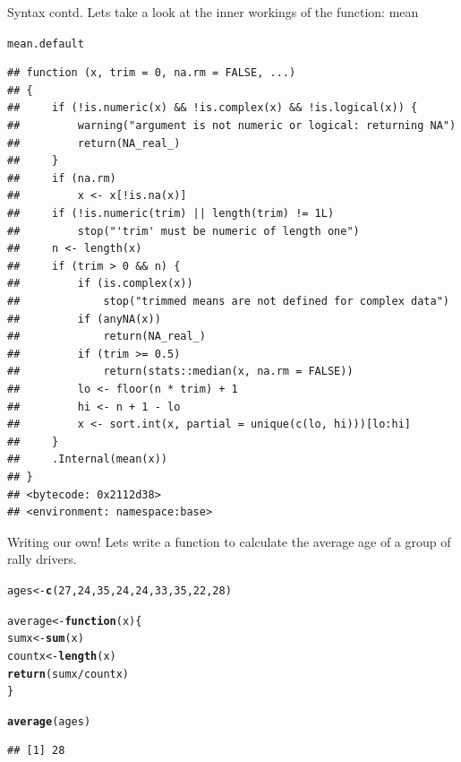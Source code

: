 \documentclass{beamer}\usepackage[]{graphicx}\usepackage[]{color}
\makeatletter
\newcommand{\hlnum}[1]{\textcolor[rgb]{0.686,0.059,0.569}{#1}}%
\newcommand{\hlopt}[1]{\textcolor[rgb]{0,0,0}{#1}}%
\newcommand{\hlstd}[1]{\textcolor[rgb]{0.345,0.345,0.345}{#1}}%
\newcommand{\hlkwa}[1]{\textcolor[rgb]{0.161,0.373,0.58}{\textbf{#1}}}%
\newcommand{\hlkwb}[1]{\textcolor[rgb]{0.69,0.353,0.396}{#1}}%
\newcommand{\hlkwc}[1]{\textcolor[rgb]{0.333,0.667,0.333}{#1}}%
\newcommand{\hlkwd}[1]{\textcolor[rgb]{0.737,0.353,0.396}{\textbf{#1}}}%
\newenvironment{kframe}{%
 \def\at@end@of@kframe{}%
 \ifinner\ifhmode%
  \def\at@end@of@kframe{\end{minipage}}%
  \begin{minipage}{\columnwidth}%
 \fi\fi%
 \def\FrameCommand##1{\hskip\@totalleftmargin \hskip-\fboxsep
 \colorbox{shadecolor}{##1}\hskip-\fboxsep
     \hskip-\linewidth \hskip-\@totalleftmargin \hskip\columnwidth}%
 \MakeFramed {\advance\hsize-\width
   \@totalleftmargin\z@ \linewidth\hsize
   \@setminipage}}%
 {\par\unskip\endMakeFramed%
 \at@end@of@kframe}
\newenvironment{knitrout}{}{} %
\makeatother
\begin{document}
\begin{frame}[fragile]{Syntax contd.}
Lets take a look at the inner workings of the function: mean
\begin{knitrout}
\color{fgcolor}\begin{kframe}
\begin{alltt}
\hlstd{mean.default}
\end{alltt}
\begin{verbatim}
## function (x, trim = 0, na.rm = FALSE, ...) 
## {
##     if (!is.numeric(x) && !is.complex(x) && !is.logical(x)) {
##         warning("argument is not numeric or logical: returning NA")
##         return(NA_real_)
##     }
##     if (na.rm) 
##         x <- x[!is.na(x)]
##     if (!is.numeric(trim) || length(trim) != 1L) 
##         stop("'trim' must be numeric of length one")
##     n <- length(x)
##     if (trim > 0 && n) {
##         if (is.complex(x)) 
##             stop("trimmed means are not defined for complex data")
##         if (anyNA(x)) 
##             return(NA_real_)
##         if (trim >= 0.5) 
##             return(stats::median(x, na.rm = FALSE))
##         lo <- floor(n * trim) + 1
##         hi <- n + 1 - lo
##         x <- sort.int(x, partial = unique(c(lo, hi)))[lo:hi]
##     }
##     .Internal(mean(x))
## }
## <bytecode: 0x2112d38>
## <environment: namespace:base>
\end{verbatim}
\end{kframe}
\end{knitrout}

\end{frame}

\begin{frame}[fragile]{Writing our own!}
Lets write a function to calculate the average age of a group of rally drivers.
\begin{knitrout}
\color{fgcolor}\begin{kframe}
\begin{alltt}
\hlstd{ages} \hlkwb{<-} \hlkwd{c}\hlstd{(}\hlnum{27}\hlstd{,} \hlnum{24}\hlstd{,} \hlnum{35}\hlstd{,} \hlnum{24}\hlstd{,} \hlnum{24}\hlstd{,} \hlnum{33}\hlstd{,} \hlnum{35}\hlstd{,} \hlnum{22}\hlstd{,} \hlnum{28}\hlstd{)}

\hlstd{average} \hlkwb{<-} \hlkwa{function}\hlstd{(}\hlkwc{x}\hlstd{) \{}
    \hlstd{sumx} \hlkwb{<-} \hlkwd{sum}\hlstd{(x)}
    \hlstd{countx} \hlkwb{<-} \hlkwd{length}\hlstd{(x)}
    \hlkwd{return}\hlstd{(sumx}\hlopt{/}\hlstd{countx)}
\hlstd{\}}

\hlkwd{average}\hlstd{(ages)}
\end{alltt}
\begin{verbatim}
## [1] 28
\end{verbatim}
\end{kframe}
\end{knitrout}

\end{frame}
\end{document}
